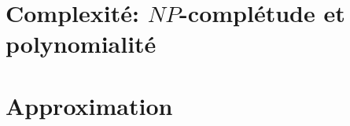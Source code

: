 \section{Complexité: \(NP\)-complétude et polynomialité}\label{sec:s_1}




\section{Approximation}\label{subsec:s_2}


